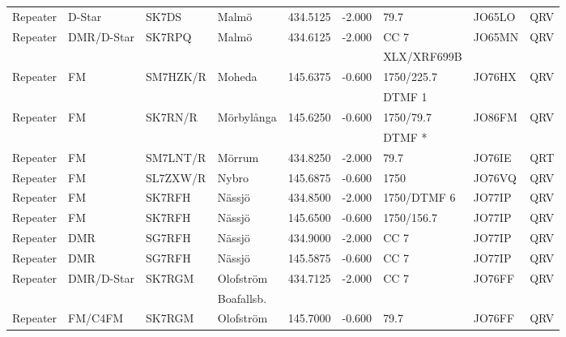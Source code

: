\begin{longtable}{llllrrlll}
Repeater & D-Star          & SK7DS    & Malmö        & 434.5125     & -2.000     & 79.7         & JO65LO      & QRV      \\
Repeater & DMR/D-Star      & SK7RPQ   & Malmö        & 434.6125     & -2.000     & CC 7         & JO65MN      & QRV      \\
         &                 &          &              &              &            & XLX/XRF699B  &             &          \\
Repeater & FM              & SM7HZK/R & Moheda       & 145.6375     & -0.600     & 1750/225.7   & JO76HX      & QRV      \\
         &                 &          &              &              &            & DTMF 1       &             &          \\
Repeater & FM              & SK7RN/R  & Mörbylånga   & 145.6250     & -0.600     & 1750/79.7    & JO86FM      & QRV      \\
         &                 &          &              &              &            & DTMF *       &             &          \\
Repeater & FM              & SM7LNT/R & Mörrum       & 434.8250     & -2.000     & 79.7         & JO76IE      & QRT      \\
Repeater & FM              & SL7ZXW/R & Nybro        & 145.6875     & -0.600     & 1750         & JO76VQ      & QRV      \\
Repeater & FM              & SK7RFH   & Nässjö       & 434.8500     & -2.000     & 1750/DTMF 6  & JO77IP      & QRV      \\
Repeater & FM              & SK7RFH   & Nässjö       & 145.6500     & -0.600     & 1750/156.7   & JO77IP      & QRV      \\
Repeater & DMR             & SG7RFH   & Nässjö       & 434.9000     & -2.000     & CC 7         & JO77IP      & QRV      \\
Repeater & DMR             & SG7RFH   & Nässjö       & 145.5875     & -0.600     & CC 7         & JO77IP      & QRV      \\
Repeater & DMR/D-Star      & SK7RGM   & Olofström    & 434.7125     & -2.000     & CC 7         & JO76FF      & QRV      \\
         &                 &          & Boafallsb.   &              &            &              &             &          \\
Repeater & FM/C4FM         & SK7RGM   & Olofström    & 145.7000     & -0.600     & 79.7         & JO76FF      & QRV      \\

\end{longtable}
